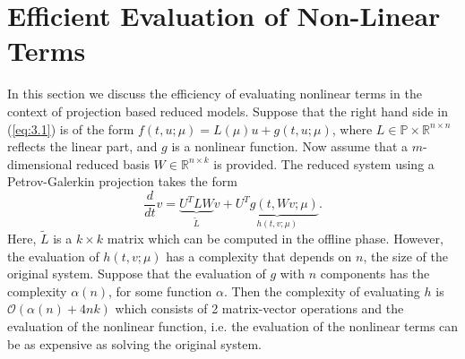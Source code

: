 \section{Efficient Evaluation of Non-Linear Terms}

In this section we discuss the efficiency of evaluating nonlinear terms in the context of projection based reduced models. Suppose that the right hand side in (\ref{eq:3.1}) is of the form $f(t, u ; \mu) = L(\mu) u + g(t,u ; \mu)$, where $L\in \mathbb P \times \mathbb R^{n\times n}$ reflects the linear part, and $g$ is a nonlinear function. Now assume that a $m$-dimensional reduced basis $W \in \mathbb R^{n\times k}$ is provided. The reduced system using a Petrov-Galerkin projection takes the form
\begin{equation} \label{eq:3.29}
	\frac{d}{dt} v= \underbrace{ U^T L W}_{\tilde L} v + \underbrace{ U^T g(t,Wv;\mu)}_{ h (t,v;\mu)}.
\end{equation}
Here, $\tilde L$ is a $k\times k$ matrix which can be computed in the offline phase. However, the evaluation of $ h (t,v;\mu)$ has a complexity that depends on $n$, the size of the original system. Suppose that the evaluation of $g$ with $n$ components has the complexity $\alpha(n)$, for some function $\alpha$. Then the complexity of evaluating $h$ is $\mathcal{O}(\alpha(n) + 4nk)$ which consists of 2 matrix-vector operations and the evaluation of the nonlinear function, i.e. the evaluation of the nonlinear terms can be as expensive as solving the original system.

